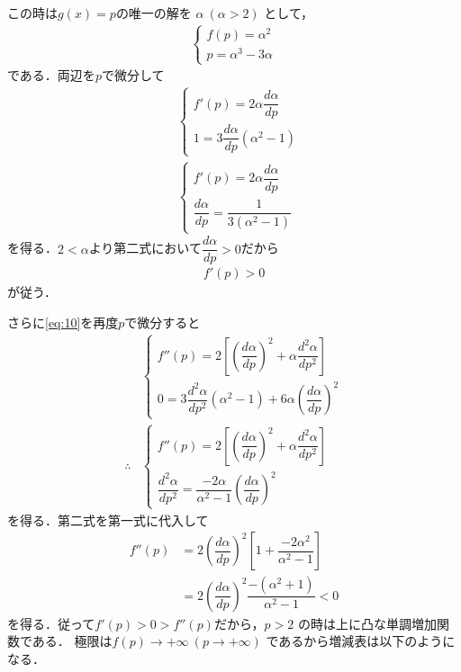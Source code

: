 \documentclass[../../main.tex]{subfiles}
\begin{document}
この時は$g(x)=p$の唯一の解を $\alpha \ (\alpha > 2)$ として，
\begin{align}
  \begin{cases}
    f(p) = \alpha^2 \\
    p = \alpha^3 - 3\alpha
  \end{cases} \label{eq:9}
\end{align}
である．両辺を$p$で微分して
\begin{align}
  &
  \begin{cases}
    f'(p) = 2\alpha\dfrac{d\alpha}{dp} \\
    1 = 3\dfrac{d\alpha}{dp}\left(\alpha^2-1\right)
  \end{cases} \label{eq:10}\\
  &
  \begin{cases}
    f'(p) = 2\alpha\dfrac{d\alpha}{dp} \\
    \dfrac{d\alpha}{dp} = \dfrac{1}{3(\alpha^2-1)}
  \end{cases} \label{eq:11}
\end{align}
を得る．$2<\alpha$より第二式において$\dfrac{d\alpha}{dp}>0$だから
\begin{align}
  f'(p)>0
\end{align}
が従う．

さらに\cref{eq:10}を再度$p$で微分すると
\begin{align}
  &
  \begin{cases}
    f''(p) = 2\left[\left(\dfrac{d\alpha}{dp}\right)^2+\alpha\dfrac{d^2\alpha}{dp^2}\right] \\
    0 = 3\dfrac{d^2\alpha}{dp^2}\left(\alpha^2-1\right) + 6\alpha \left(\dfrac{d\alpha}{dp}\right)^2
  \end{cases} \\
  \therefore
  &
  \begin{cases}
    f''(p) = 2\left[\left(\dfrac{d\alpha}{dp}\right)^2+\alpha\dfrac{d^2\alpha}{dp^2}\right] \\
    \dfrac{d^2\alpha}{dp^2} = \dfrac{-2\alpha}{\alpha^2-1} \left(\dfrac{d\alpha}{dp}\right)^2
  \end{cases}
\end{align}
を得る．第二式を第一式に代入して
\begin{align}
  f''(p)
  &= 2\left(\dfrac{d\alpha}{dp}\right)^2\left[1 + \dfrac{-2\alpha^2}{\alpha^2-1}\right] \\
  &= 2\left(\dfrac{d\alpha}{dp}\right)^2\dfrac{-(\alpha^2+1)}{\alpha^2-1} < 0
\end{align}
を得る．従って$f'(p)>0>f''(p)$だから，$p > 2$ の時は上に凸な単調増加関数である．
極限は$f(p) \to +\infty \ (p \to +\infty)$ であるから増減表は以下のようになる．
\end{document}
